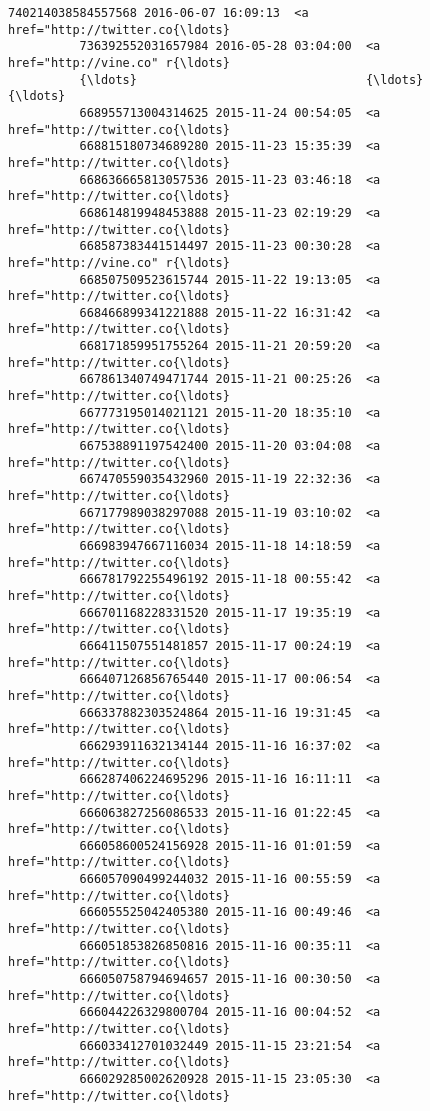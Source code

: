 \documentclass[11pt]{article}
\begin{document}
\begin{Verbatim}[commandchars=\\\{\}]
          740214038584557568 2016-06-07 16:09:13  <a href="http://twitter.co{\ldots}   
          736392552031657984 2016-05-28 03:04:00  <a href="http://vine.co" r{\ldots}   
          {\ldots}                                {\ldots}                            {\ldots}   
          668955713004314625 2015-11-24 00:54:05  <a href="http://twitter.co{\ldots}   
          668815180734689280 2015-11-23 15:35:39  <a href="http://twitter.co{\ldots}   
          668636665813057536 2015-11-23 03:46:18  <a href="http://twitter.co{\ldots}   
          668614819948453888 2015-11-23 02:19:29  <a href="http://twitter.co{\ldots}   
          668587383441514497 2015-11-23 00:30:28  <a href="http://vine.co" r{\ldots}   
          668507509523615744 2015-11-22 19:13:05  <a href="http://twitter.co{\ldots}   
          668466899341221888 2015-11-22 16:31:42  <a href="http://twitter.co{\ldots}   
          668171859951755264 2015-11-21 20:59:20  <a href="http://twitter.co{\ldots}   
          667861340749471744 2015-11-21 00:25:26  <a href="http://twitter.co{\ldots}   
          667773195014021121 2015-11-20 18:35:10  <a href="http://twitter.co{\ldots}   
          667538891197542400 2015-11-20 03:04:08  <a href="http://twitter.co{\ldots}   
          667470559035432960 2015-11-19 22:32:36  <a href="http://twitter.co{\ldots}   
          667177989038297088 2015-11-19 03:10:02  <a href="http://twitter.co{\ldots}   
          666983947667116034 2015-11-18 14:18:59  <a href="http://twitter.co{\ldots}   
          666781792255496192 2015-11-18 00:55:42  <a href="http://twitter.co{\ldots}   
          666701168228331520 2015-11-17 19:35:19  <a href="http://twitter.co{\ldots}   
          666411507551481857 2015-11-17 00:24:19  <a href="http://twitter.co{\ldots}   
          666407126856765440 2015-11-17 00:06:54  <a href="http://twitter.co{\ldots}   
          666337882303524864 2015-11-16 19:31:45  <a href="http://twitter.co{\ldots}   
          666293911632134144 2015-11-16 16:37:02  <a href="http://twitter.co{\ldots}   
          666287406224695296 2015-11-16 16:11:11  <a href="http://twitter.co{\ldots}   
          666063827256086533 2015-11-16 01:22:45  <a href="http://twitter.co{\ldots}   
          666058600524156928 2015-11-16 01:01:59  <a href="http://twitter.co{\ldots}   
          666057090499244032 2015-11-16 00:55:59  <a href="http://twitter.co{\ldots}   
          666055525042405380 2015-11-16 00:49:46  <a href="http://twitter.co{\ldots}   
          666051853826850816 2015-11-16 00:35:11  <a href="http://twitter.co{\ldots}   
          666050758794694657 2015-11-16 00:30:50  <a href="http://twitter.co{\ldots}   
          666044226329800704 2015-11-16 00:04:52  <a href="http://twitter.co{\ldots}   
          666033412701032449 2015-11-15 23:21:54  <a href="http://twitter.co{\ldots}   
          666029285002620928 2015-11-15 23:05:30  <a href="http://twitter.co{\ldots}   
          

\end{Verbatim}
\end{document}
